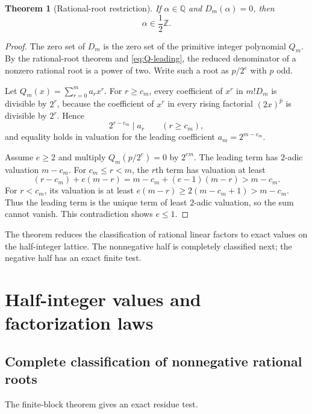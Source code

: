 \documentclass[11pt,oneside]{article}
\newtheorem{theorem}{Theorem}[section]
\theoremstyle{definition}
\theoremstyle{remark}
\newcommand{\Z}{\mathbb Z}
\newcommand{\Q}{\mathbb Q}
\newcommand{\Diag}{D}
\newcommand{\rising}[2]{#1^{\overline{#2}}}
\begin{document}
\begin{theorem}[Rational-root restriction]
\label{thm:rational-root-half}
If $\alpha\in\Q$ and $\Diag_m(\alpha)=0$, then
\begin{equation}
 \alpha\in\frac12\Z.
 \label{eq:rational-root-half}
\end{equation}
\end{theorem}

\begin{proof}
The zero set of $\Diag_m$ is the zero set of the primitive integer polynomial
$Q_m$.  By the rational-root theorem and \eqref{eq:Q-leading}, the reduced
denominator of a nonzero rational root is a power of two.  Write such a root
as $p/2^e$ with $p$ odd.

Let $Q_m(x)=\sum_{r=0}^{m}a_rx^r$.  For $r\ge c_m$, every coefficient of
$x^r$ in $m!\Diag_m$ is divisible by $2^r$, because the coefficient of
$x^r$ in every rising factorial $\rising{(2x)}p$ is divisible by $2^r$.
Hence
\begin{equation}
 2^{r-c_m}\mid a_r\qquad(r\ge c_m),
 \label{eq:coefficient-v2-bound}
\end{equation}
and equality holds in valuation for the leading coefficient
$a_m=2^{m-c_m}$.

Assume $e\ge2$ and multiply $Q_m(p/2^e)=0$ by $2^{em}$.  The leading term
has $2$-adic valuation $m-c_m$.  For $c_m\le r<m$, the $r$th term has
valuation at least
\[
 (r-c_m)+e(m-r)
 =m-c_m+(e-1)(m-r)>m-c_m.
\]
For $r<c_m$, its valuation is at least
$e(m-r)\ge2(m-c_m+1)>m-c_m$.  Thus the leading term is the unique term of
least $2$-adic valuation, so the sum cannot vanish.  This contradiction shows
$e\le1$.
\end{proof}

The theorem reduces the classification of rational linear factors to exact
values on the half-integer lattice.  The nonnegative half is completely
classified next; the negative half has an exact finite test.

\section{Half-integer values and factorization laws}
\label{sec:roots}

\subsection{Complete classification of nonnegative rational roots}

The finite-block theorem gives an exact residue test.
\end{document}
